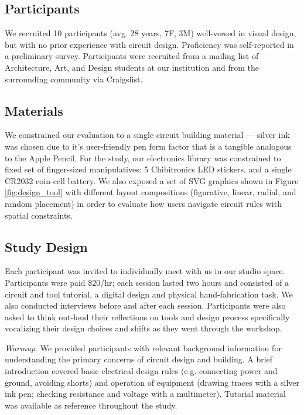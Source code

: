\documentclass{sigchi}
\begin{document}
\subsection{Participants}
    We recruited 10 participants (avg. 28 years, 7F, 3M) well-versed in visual design, but with no prior experience with circuit design. Proficiency was self-reported in a preliminary survey. Participants were recruited from a mailing list of Architecture, Art, and Design students at our institution and from the surrounding community via Craigslist.

\subsection{Materials}
    We constrained our evaluation to a single circuit building material --- silver ink was chosen due to it's user-friendly pen form factor that is a tangible analogous to the Apple Pencil. For the study, our electronics library was constrained to fixed set of finger-sized manipulatives: 5 Chibitronics LED stickers, and a single CR2032 coin-cell battery. We also exposed a set of SVG graphics shown in Figure \ref{fig:design_tool} with different layout compositions (figurative, linear, radial, and random placement) in order to evaluate how users navigate circuit rules with spatial constraints. 

\subsection{Study Design}
    Each participant was invited to individually meet with us in our studio space. Participants were paid \$20/hr; each session lasted two hours and consisted of a circuit and tool tutorial, a digital design and physical hand-fabrication task. We also conducted interviews before and after each session. Participants were also asked to think out-loud their reflections on tools and design process specifically vocalizing their design choices and shifts as they went through the workshop. 

    \textit{Warmup}. We provided participants with relevant background information for understanding the primary concerns of circuit design and building. A brief introduction covered basic electrical design rules (e.g. connecting power and ground, avoiding shorts) and operation of equipment (drawing traces with a silver ink pen; checking resistance and voltage with a multimeter). Tutorial material was available as reference throughout the study. 
\end{document}
